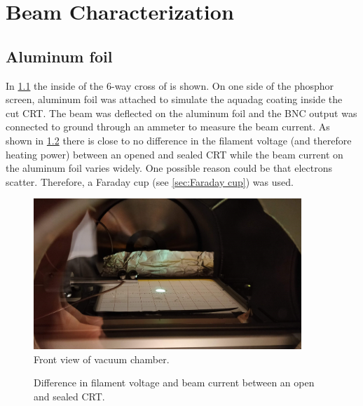 
\chapter{Beam Characterization}
\label{ch:Beam Characterization}


\section{Aluminum foil}
\label{sec:Aluminum foil}

In \cref{fig:Front view of vacuum chamber} the inside of the 6-way cross of is shown. On one side of the phosphor screen, aluminum foil was attached to simulate the aquadag coating inside the cut CRT. The beam was deflected on the aluminum foil and the BNC output was connected to ground through an ammeter to measure the beam current. As shown in \cref{fig:Difference in filament voltage and beam current between an open and sealed CRT} there is close to no difference in the filament voltage (and therefore heating power) between an opened and sealed CRT while the beam current on the aluminum foil varies widely. One possible reason could be that electrons scatter. Therefore, a Faraday cup (see \cref{sec:Faraday cup}) was used.

\begin{figure}[h]
	\centering
	\includegraphics[width=0.9\textwidth]{./Chapters/beam-characterization/center_image}
	\caption{Front view of vacuum chamber.}
	\label{fig:Front view of vacuum chamber}
\end{figure}


\begin{figure}[ht]
	\centering
	
	\begin{tikzpicture}
		
	\end{tikzpicture}
	
	\caption{Difference in filament voltage and beam current between an open and sealed CRT.}
	\label{fig:Difference in filament voltage and beam current between an open and sealed CRT}
\end{figure}

